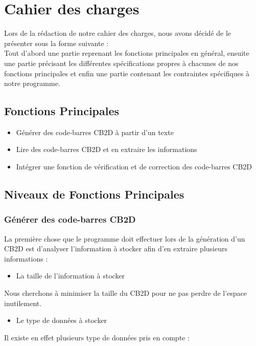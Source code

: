 \newpage 

\section{Cahier des charges}

Lors de la rédaction de notre cahier des charges, nous avons décidé de le présenter sous la forme suivante : \\
Tout d'abord une partie reprenant les fonctions principales en général, ensuite une partie précisant les différentes spécifications propres à chacunes de nos fonctions principales et enfin une partie contenant les contraintes spécifiques à notre programme. 

\subsection{Fonctions Principales}

\begin{itemize}
\item Générer des code-barres CB2D à partir d'un texte
\item Lire des code-barres CB2D et en extraire les informations
\item Intégrer une fonction de vérification et de correction des code-barres CB2D
\end{itemize}

\subsection{Niveaux de Fonctions Principales}

\subsubsection{Générer des code-barres CB2D} 

La première chose que le programme doit effectuer lors de la génération d'un CB2D est d'analyser l'information à stocker afin d'en extraire plusieurs informations : \\

\begin{itemize}
\item La taille de l'information à stocker
\end{itemize}
Nous cherchons à minimiser la taille du CB2D pour ne pas perdre de l'espace inutilement. \\

\begin{itemize}
\item Le type de données à stocker
\end{itemize}
Il existe en effet plusieurs type de données pris en compte : 


